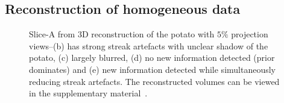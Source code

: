 \documentclass[journal]{IEEEtran}
\begin{document}
\subsection{Reconstruction of homogeneous data}
\label{Sec:potato}
\begin{figure}[!h]
\centering
{}\hfill
{}\hfill
{}\hfill
{}\hfill
{}
\caption{Slice-A from 3D reconstruction of the potato with $5\%$ projection views--(b) has strong streak artefacts with unclear shadow of the potato, (c) largely blurred, (d) no new information detected (prior dominates) and (e) new information detected while simultaneously reducing streak artefacts. The reconstructed volumes can be viewed in the supplementary material~\cite{supp_paper}.}
\label{fig:potato_3D_results_A}
\end{figure}
\end{document}
